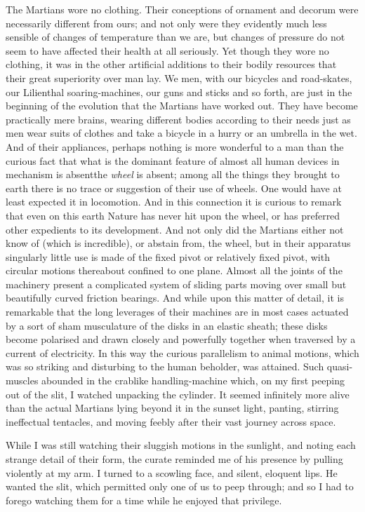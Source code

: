 The Martians wore no clothing. Their conceptions of ornament and
decorum were necessarily different from ours; and not only were
they evidently much less sensible of changes of temperature than we
are, but changes of pressure do not seem to have affected their
health at all seriously. Yet though they wore no clothing, it was
in the other artificial additions to their bodily resources that
their great superiority over man lay. We men, with our bicycles and
road-skates, our Lilienthal soaring-machines, our guns and sticks
and so forth, are just in the beginning of the evolution that the
Martians have worked out. They have become practically mere brains,
wearing different bodies according to their needs just as men wear
suits of clothes and take a bicycle in a hurry or an umbrella in
the wet. And of their appliances, perhaps nothing is more wonderful
to a man than the curious fact that what is the dominant feature of
almost all human devices in mechanism is absent\dash{}the \emph{wheel}
is absent; among all the things they brought to earth there is no
trace or suggestion of their use of wheels. One would have at least
expected it in locomotion. And in this connection it is curious to
remark that even on this earth Nature has never hit upon the wheel,
or has preferred other expedients to its development. And not only
did the Martians either not know of (which is incredible), or
abstain from, the wheel, but in their apparatus singularly little
use is made of the fixed pivot or relatively fixed pivot, with
circular motions thereabout confined to one plane. Almost all the
joints of the machinery present a complicated system of sliding
parts moving over small but beautifully curved friction bearings.
And while upon this matter of detail, it is remarkable that the
long leverages of their machines are in most cases actuated by a
sort of sham musculature of the disks in an elastic sheath; these
disks become polarised and drawn closely and powerfully together
when traversed by a current of electricity. In this way the curious
parallelism to animal motions, which was so striking and disturbing
to the human beholder, was attained. Such quasi-muscles abounded in
the crablike handling-machine which, on my first peeping out of the
slit, I watched unpacking the cylinder. It seemed infinitely more
alive than the actual Martians lying beyond it in the sunset light,
panting, stirring ineffectual tentacles, and moving feebly after
their vast journey across space.

While I was still watching their sluggish motions in the sunlight,
and noting each strange detail of their form, the curate reminded
me of his presence by pulling violently at my arm. I turned to a
scowling face, and silent, eloquent lips. He wanted the slit, which
permitted only one of us to peep through; and so I had to forego
watching them for a time while he enjoyed that privilege.

